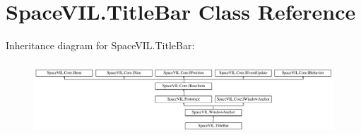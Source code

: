 \hypertarget{class_space_v_i_l_1_1_title_bar}{}\section{Space\+V\+I\+L.\+Title\+Bar Class Reference}
\label{class_space_v_i_l_1_1_title_bar}
Inheritance diagram for Space\+V\+I\+L.\+Title\+Bar\+:\begin{figure}[H]
\begin{center}
\leavevmode
\includegraphics[height=2.800000cm]{class_space_v_i_l_1_1_title_bar}
\end{center}
\end{figure}

